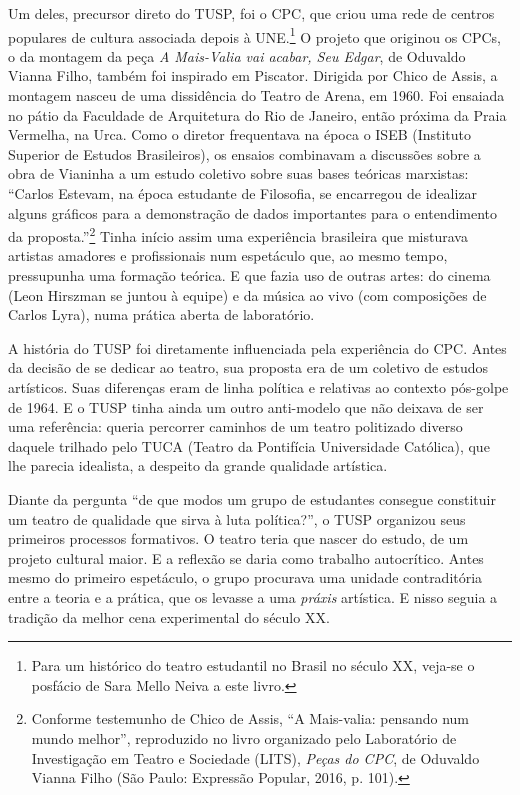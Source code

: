 Um deles, precursor direto do TUSP, foi o CPC, que criou uma rede de
centros populares de cultura associada depois à UNE.\footnote{Para um
  histórico do teatro estudantil no Brasil no século XX, veja-se o
  posfácio de Sara Mello Neiva a este livro.} O projeto que originou os
CPCs, o da montagem da peça \textit{A Mais-Valia vai acabar, Seu Edgar}, de
Oduvaldo Vianna Filho, também foi inspirado em Piscator. Dirigida por
Chico de Assis, a montagem nasceu de uma dissidência do Teatro de Arena,
em 1960. Foi ensaiada no pátio da Faculdade de Arquitetura do Rio de
Janeiro, então próxima da Praia Vermelha, na Urca. Como o diretor
frequentava na época o ISEB (Instituto Superior de Estudos Brasileiros),
os ensaios combinavam a discussões sobre a obra de Vianinha a um estudo
coletivo sobre suas bases teóricas marxistas: “Carlos Estevam, na época
estudante de Filosofia, se encarregou de idealizar alguns gráficos para
a demonstração de dados importantes para o entendimento da
proposta.”\footnote{Conforme testemunho de Chico de Assis, “A
  Mais-valia: pensando num mundo melhor”, reproduzido no livro
  organizado pelo Laboratório de Investigação em Teatro e Sociedade
  (LITS), \textit{Peças do CPC}, de Oduvaldo Vianna Filho (São Paulo:
  Expressão Popular, 2016, p. 101).} Tinha início assim uma experiência
brasileira que misturava artistas amadores e profissionais num
espetáculo que, ao mesmo tempo, pressupunha uma formação teórica. E que
fazia uso de outras artes: do cinema (Leon Hirszman se juntou à equipe)
e da música ao vivo (com composições de Carlos Lyra), numa prática
aberta de laboratório.

A história do TUSP foi diretamente influenciada pela experiência do CPC.
Antes da decisão de se dedicar ao teatro, sua proposta era de um
coletivo de estudos artísticos. Suas diferenças eram de linha política e
relativas ao contexto pós-golpe de 1964. E o TUSP tinha ainda um outro
anti-modelo que não deixava de ser uma referência: queria percorrer
caminhos de um teatro politizado diverso daquele trilhado pelo TUCA
(Teatro da Pontifícia Universidade Católica), que lhe parecia idealista,
a despeito da grande qualidade artística.

Diante da pergunta “de que modos um grupo de estudantes consegue
constituir um teatro de qualidade que sirva à luta política?”, o TUSP
organizou seus primeiros processos formativos. O teatro teria que nascer
do estudo, de um projeto cultural maior. E a reflexão se daria como
trabalho autocrítico. Antes mesmo do primeiro espetáculo, o grupo
procurava uma unidade contraditória entre a teoria e a prática, que os
levasse a uma \textit{práxis} artística. E nisso seguia a tradição da
melhor cena experimental do século XX.

